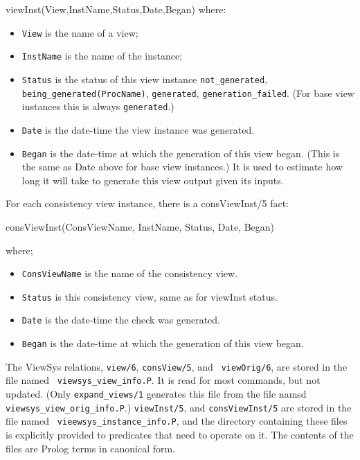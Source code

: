 \noindent viewInst(View,InstName,Status,Date,Began)
where:
\begin{itemize}

\item {\tt View} is the name of a view;

\item {\tt InstName} is the name of the instance;
	   
\item {\tt Status} is the status of this view instance
{\tt not\_generated}, {\tt being\_generated(ProcName)}, {\tt generated},
{\tt generation\_failed}. (For base view instances this is always
{\tt generated}.)

\item {\tt Date} is the date-time the view instance was generated.

\item {\tt Began} is the date-time at which the generation of this
view began.  (This is the same as Date above for base view instances.)
It is used to estimate how long it will take to generate this view
output given its inputs.

\end{itemize}

For each consistency view instance, there is a consViewInst/5 fact:

\noindent consViewInst(ConsViewName, InstName, Status, Date, Began)

\noindent 
where;

\begin{itemize}

\item {\tt ConsViewName} is the name of the consistency view.

\item {\tt Status} is this consistency view, same as for viewInst
status.

\item {\tt Date} is the date-time the check was generated.

\item {\tt Began} is the date-time at which the generation of this
view began.

\end{itemize}

The ViewSys relations, {\tt view/6}, {\tt consView/5}, and {\tt
  viewOrig/6}, are stored in the file named {\tt
  viewsys\_view\_info.P}.  It is read for most commands, but not
updated.  (Only {\tt expand\_views/1} generates this file from the
file namsd {\tt viewsys\_view\_orig\_info.P}.)  {\tt viewInst/5},
  and {\tt consViewInst/5} are stored in the file named {\tt
    vieewsys\_instance\_info.P}, and the directory containing these
    files is explicitly provided to predicates that need to operate on
    it.  The contents of the files are Prolog terms in canonical form.

